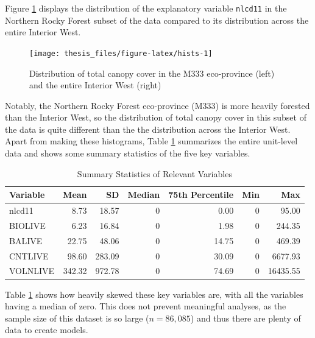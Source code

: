 \documentclass[12pt,twoside]{reedthesis}
\begin{document}
Figure \ref{fig:hists} displays the distribution of the explanatory variable \texttt{nlcd11} in the Northern Rocky Forest subset of the data compared to its distribution across the entire Interior West.
\begin{figure}

{\centering \texttt{[image: thesis\_files/figure-latex/hists-1]} 

}

\caption[Total canopy cover in the M333 eco-province and Interior West]{Distribution of total canopy cover in the M333 eco-province (left) and the entire Interior West (right)}\label{fig:hists}
\end{figure}
Notably, the Northern Rocky Forest eco-province (M333) is more heavily forested than the Interior West, so the distribution of total canopy cover in this subset of the data is quite different than the the distribution across the Interior West. Apart from making these histograms, Table \ref{tab:var-tab} summarizes the entire unit-level data and shows some summary statistics of the five key variables.
\clearpage
\begin{longtable}[t]{lrrrrrr}
\caption[Summary Statistics of Relevant Variables]{\label{tab:var-tab}Summary Statistics of Relevant Variables}\\
\toprule
Variable & Mean & SD & Median & 75th Percentile & Min & Max\\
\midrule
nlcd11 & 8.73 & 18.57 & 0 & 0.00 & 0 & 95.00\\
BIOLIVE & 6.23 & 16.84 & 0 & 1.98 & 0 & 244.35\\
BALIVE & 22.75 & 48.06 & 0 & 14.75 & 0 & 469.39\\
CNTLIVE & 98.60 & 283.09 & 0 & 30.09 & 0 & 6677.93\\
VOLNLIVE & 342.32 & 972.78 & 0 & 74.69 & 0 & 16435.55\\
\bottomrule
\end{longtable}
Table \ref{tab:var-tab} shows how heavily skewed these key variables are, with all the variables having a median of zero. This does not prevent meaningful analyses, as the sample size of this dataset is so large (\(n = 86,085\)) and thus there are plenty of data to create models.
\end{document}
